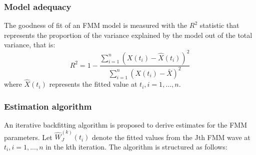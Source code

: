 \subsubsection{Model adequacy} \label{subsubsec:multiFMM:R2}
The goodness of fit of an FMM model is measured with the $R^2$ statistic that represents the proportion of the variance explained by the model out of the total variance, that is:
%
\begin{equation} \label{eq:multiFMM:R2}
   R^2 = 1 - \frac{\sum_{i=1}^{n} \left(X\left(t_i\right) - \hat{X}\left(t_i\right)\right)^2}{\sum_{i=1}^{n} \left(X\left(t_i\right) - \bar{X}\right)^2}
\end{equation}
% 
where $\hat{X}\left(t_i\right)$ represents the fitted value at $t_i, i=1, \dots ,n$.

\subsubsection{Estimation algorithm} \label{subsubsec:multiFMM:estimation}
An iterative backfitting algorithm is proposed to derive estimates for the FMM parameters. Let $\hat{W}_J^{\left(k\right)}\left(t_i\right)$ denote the fitted values from the Jth FMM wave at $t_i, i=1,...,n$ in the kth iteration. The algorithm is structured as follows:
%
